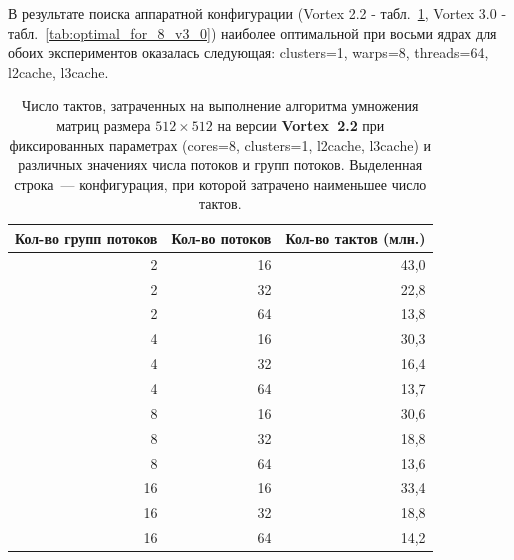 \documentclass[a4paper]{article}
\begin{document}
В результате поиска аппаратной конфигурации (Vortex 2.2 - табл.~\ref{tab:optimal_for_8_v2_2}, Vortex 3.0 - табл.~\ref{tab:optimal_for_8_v3_0}) наиболее оптимальной при восьми ядрах для обоих экспериментов оказалась следующая: clusters=1, warps=8, threads=64, l2cache, l3cache.
\begin{table}[p]
    \centering
    \caption{\label{tab:optimal_for_8_v2_2} Число тактов, затраченных на выполнение алгоритма умножения матриц размера $512\times512$ на версии \textbf{Vortex~2.2} при фиксированных параметрах (cores=8, clusters=1, l2cache, l3cache) и различных значениях числа потоков и групп потоков. Выделенная строка~--- конфигурация, при которой затрачено наименьшее число тактов.}
    \begin{tabular}{r r r}
        \hline
        \multicolumn{1}{c}{Кол-во групп потоков} & \multicolumn{1}{c}{Кол-во потоков} & \multicolumn{1}{c}{Кол-во тактов (млн.)} \\ \hline
        2 & 16 & 43,0 \\ \hline
        2 & 32 & 22,8 \\ \hline
        2 & 64 & 13,8 \\ \hline

        4 & 16 & 30,3 \\ \hline
        4 & 32 & 16,4 \\ \hline
        4 & 64 & 13,7 \\ \hline

        8 & 16 & 30,6 \\ \hline
        8 & 32 & 18,8 \\ \hline
        \rowcolor{lightgray}
        8 & 64 & 13,6 \\ \hline

        16 & 16 & 33,4 \\ \hline
        16 & 32 & 18,8 \\ \hline
        16 & 64 & 14,2 \\ \hline
    \end{tabular}
\end{table}
\end{document}
